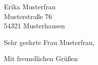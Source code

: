 \documentclass[sender]{scrlttr2}
\date{\today}
\begin{document}
\begin{letter}{%
  Erika Musterfrau \\
  Musterstraße 76 \\
  54321 Musterhausen
}

\opening{Sehr geehrte Frau Musterfrau,}

\lipsum[1-7]

\closing{Mit freundlichen Grüßen}



\end{letter}
\end{document}
